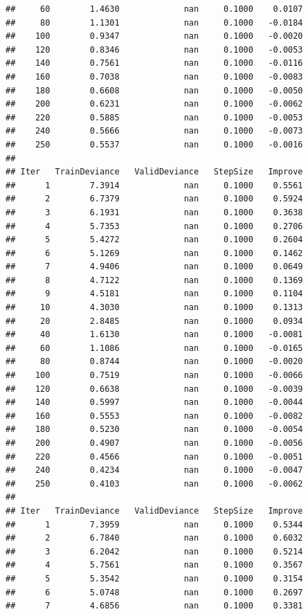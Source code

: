 \documentclass[]{book}
\begin{document}
\begin{verbatim}
##     60        1.4630             nan     0.1000    0.0107
##     80        1.1301             nan     0.1000   -0.0184
##    100        0.9347             nan     0.1000   -0.0020
##    120        0.8346             nan     0.1000   -0.0053
##    140        0.7561             nan     0.1000   -0.0116
##    160        0.7038             nan     0.1000   -0.0083
##    180        0.6608             nan     0.1000   -0.0050
##    200        0.6231             nan     0.1000   -0.0062
##    220        0.5885             nan     0.1000   -0.0053
##    240        0.5666             nan     0.1000   -0.0073
##    250        0.5537             nan     0.1000   -0.0016
## 
## Iter   TrainDeviance   ValidDeviance   StepSize   Improve
##      1        7.3914             nan     0.1000    0.5561
##      2        6.7379             nan     0.1000    0.5924
##      3        6.1931             nan     0.1000    0.3638
##      4        5.7353             nan     0.1000    0.2706
##      5        5.4272             nan     0.1000    0.2604
##      6        5.1269             nan     0.1000    0.1462
##      7        4.9406             nan     0.1000    0.0649
##      8        4.7122             nan     0.1000    0.1369
##      9        4.5181             nan     0.1000    0.1104
##     10        4.3030             nan     0.1000    0.1313
##     20        2.8485             nan     0.1000    0.0934
##     40        1.6130             nan     0.1000   -0.0081
##     60        1.1086             nan     0.1000   -0.0165
##     80        0.8744             nan     0.1000   -0.0020
##    100        0.7519             nan     0.1000   -0.0066
##    120        0.6638             nan     0.1000   -0.0039
##    140        0.5997             nan     0.1000   -0.0044
##    160        0.5553             nan     0.1000   -0.0082
##    180        0.5230             nan     0.1000   -0.0054
##    200        0.4907             nan     0.1000   -0.0056
##    220        0.4566             nan     0.1000   -0.0051
##    240        0.4234             nan     0.1000   -0.0047
##    250        0.4103             nan     0.1000   -0.0062
## 
## Iter   TrainDeviance   ValidDeviance   StepSize   Improve
##      1        7.3959             nan     0.1000    0.5344
##      2        6.7840             nan     0.1000    0.6032
##      3        6.2042             nan     0.1000    0.5214
##      4        5.7561             nan     0.1000    0.3567
##      5        5.3542             nan     0.1000    0.3154
##      6        5.0748             nan     0.1000    0.2697
##      7        4.6856             nan     0.1000    0.3381

\end{verbatim}
\end{document}
